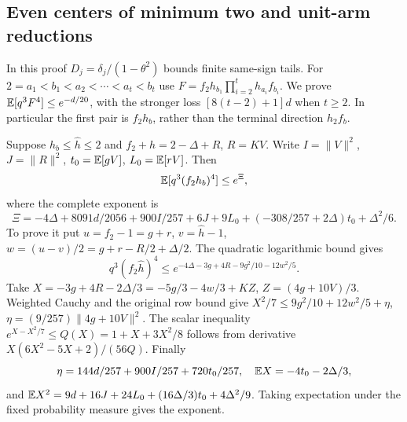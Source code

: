 \subsection{Even centers of minimum two and unit-arm reductions}\label{loc:S38}
In this proof $D_j=\delta_{j}/(1-\theta^2)$ bounds finite same-sign tails.
For $2=a_1<b_1<a_2<\cdots<a_t<b_t$ use
$F=f_2h_{b_1}\prod_{i=2}^th_{a_i}f_{b_i}$.
We prove $\mathbb E[q^3F^4]\le e^{-d/20}$, with the stronger loss
$[8(t-2)+1]d$ when $t\ge2$.
In particular the first pair is $f_2h_b$, rather than the terminal
direction $h_2f_b$.

Suppose $h_b\le\widehat h\le2$ and
$f_2+\widehat h=2-\Delta+R$, $R=KV$.
Write $I=\|V\|^2$, $J=\|R\|^2$,
$t_0=\mathbb E[gV]$, $L_0=\mathbb E[rV]$. Then
\begin{equation}\label{eq:compact-min2-center-master}
 \mathbb E[q^3(f_2h_b)^4]\le e^\Xi,
\end{equation}
where the complete exponent is
\[
 \Xi=-4\Delta+8091d/2056+900I/257+6J+9L_0
                         +(-308/257+2\Delta)t_0+\Delta^2/6.
\]
To prove it put $u=f_2-1=g+r$, $v=\widehat h-1$,
$w=(u-v)/2=g+r-R/2+\Delta/2$.
The quadratic logarithmic bound gives
\[
 q^3(f_2\widehat h)^4\le
 e^{-4\Delta-3g+4R-9g^2/10-12w^2/5}.
\]
Take $X=-3g+4R-2\Delta/3=-5g/3-4w/3+KZ$,
$Z=(4g+10V)/3$.
Weighted Cauchy and the original row bound give
$X^2/7\le9g^2/10+12w^2/5+\eta$,
$\eta=(9/257)\|4g+10V\|^2$.
The scalar inequality $e^{X-X^2/7}\le Q(X)=1+X+3X^2/8$
follows from derivative $X(6X^2-5X+2)/(56Q)$.
Finally
\[
 \eta=144d/257+900I/257+720t_0/257,\quad
 \mathbb E X=-4t_0-2\Delta/3,
\]
and $\mathbb E X^2=9d+16J+24L_0+(16\Delta/3)t_0+4\Delta^2/9$.
Taking expectation under the fixed probability measure gives the exponent.

